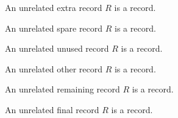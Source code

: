 \begin{struct}\label{unrelated_record_24}
    An unrelated extra record $R$ is a record.
\end{struct}

\begin{struct}\label{unrelated_record_25}
    An unrelated spare record $R$ is a record.
\end{struct}

\begin{struct}\label{unrelated_record_26}
    An unrelated unused record $R$ is a record.
\end{struct}

\begin{struct}\label{unrelated_record_27}
    An unrelated other record $R$ is a record.
\end{struct}

\begin{struct}\label{unrelated_record_28}
    An unrelated remaining record $R$ is a record.
\end{struct}

\begin{struct}\label{unrelated_record_29}
    An unrelated final record $R$ is a record.
\end{struct}
